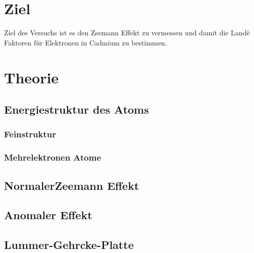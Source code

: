 \section*{Ziel}
Ziel des Versuchs ist es den Zeemann Effekt zu vermessen und damit die Landè Faktoren für Elektronen in Cadmium zu bestimmen.

\section{Theorie}
\label{sec:theorie}
\subsection{Energiestruktur des Atoms}
\label{sec:energie}
\subsubsection*{Feinstruktur}
\subsubsection*{Mehrelektronen Atome}
\subsection{NormalerZeemann Effekt}
\label{sec:normal}

\subsection{Anomaler Effekt}
\label{sec:anomaler}

\subsection{Lummer-Gehrcke-Platte}
\label{sec:platte}